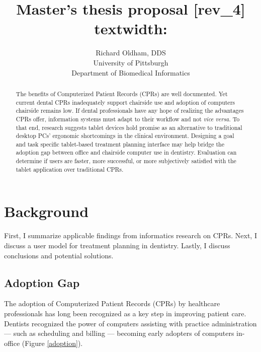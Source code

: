 \documentclass[11pt]{article}
\begin{document}
\title{Master's thesis proposal [rev\_4] textwidth: \prntlen{\textwidth}}
\author{\normalsize Richard Oldham, DDS \vspace{7pt} \\ 
		\small University of Pittsburgh \vspace{-2pt} \\
		\small Department of Biomedical Informatics}
\maketitle


\begin{abstract}
The benefits of Computerized Patient Records (CPRs) are well documented. Yet current dental CPRs inadequately support chairside use and adoption of computers chairside remains low. If dental professionals have any hope of realizing the advantages CPRs offer, information systems must adapt to their workflow and not \textit{vice versa}. To that end, research suggests tablet devices hold promise as an alternative to traditional desktop PCs' ergonomic shortcomings in the clinical environment. Designing a goal and task specific tablet-based treatment planning interface may help bridge the adoption gap between office and chairside computer use in dentistry. Evaluation can determine if users are faster, more successful, or more subjectively satisfied with the tablet application over traditional CPRs.
\end{abstract}

\section{Background}
First, I summarize applicable findings from informatics research on CPRs. Next, I discuss a user model for treatment planning in dentistry. Lastly, I discuss conclusions and potential solutions.

\subsection{Adoption Gap}

The adoption of Computerized Patient Records (CPRs) by healthcare professionals has long been recognized as a key step in improving patient care\cite{Chasteen1992A-computer-data,Eisne1993The-computer-ba,Thompson2004The-Decade-of-H,Spicer2008Bytes-and-bites,Schleyer2011Advancing-oral}. Dentists recognized the power of computers assisting with practice administration --- such as scheduling and billing --- becoming early adopters of computers in-office (Figure \ref{adoption}).
\end{document}

